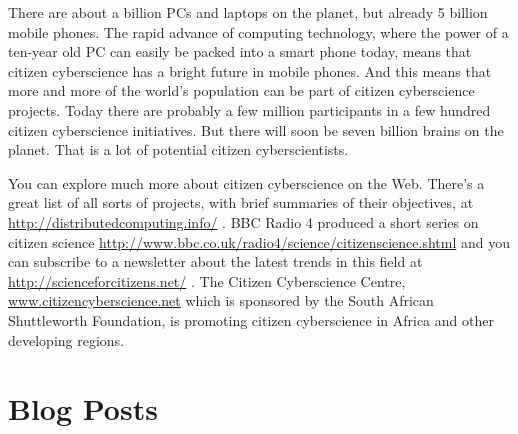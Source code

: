 There are about a billion PCs and laptops on the planet, but already 5 billion mobile phones. The rapid advance of computing technology, where the power of a ten-year old PC can easily be packed into a smart phone today, means that citizen cyberscience has a bright future in mobile phones. And this means that more and more of the world’s population can be part of citizen cyberscience projects. Today there are probably a few million participants in a few hundred citizen cyberscience initiatives. But there will soon be seven billion brains on the planet. That is a lot of potential citizen cyberscientists. 

You can explore much more about citizen cyberscience on the Web. There’s a great list of all sorts of projects, with brief summaries of their objectives, at \url{http://distributedcomputing.info/} . BBC Radio 4 produced a short series on citizen science \url{http://www.bbc.co.uk/radio4/science/citizenscience.shtml}  and you can subscribe to a newsletter about the latest trends in this field at \url{http://scienceforcitizens.net/}  . The Citizen Cyberscience Centre, \url{www.citizencyberscience.net}  which is sponsored by the South African Shuttleworth Foundation, is promoting citizen cyberscience in Africa and other developing regions.

\section{Blog Posts}

